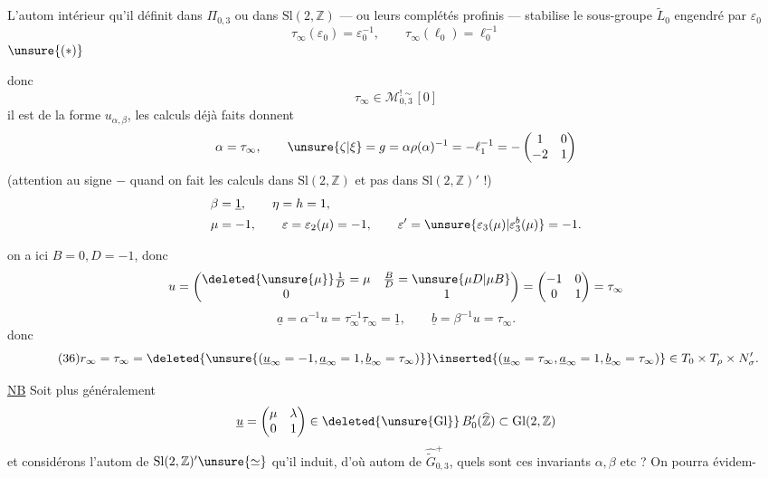 L'autom intérieur qu'il définit dans $\Pi_{0,3}$ ou dans $\mathrm{Sl}(2,\mathbb Z)$ --- ou leurs complétés profinis --- stabilise le sous-groupe $\widetilde L_0$ engendré par $\varepsilon_0$ 
\[
\tau_\infty(\varepsilon_0)=\varepsilon_0^{-1},\qquad\tau_\infty(\ell_0)=\ell_0^{-1}
\]
$\unsure{(\ast)}$

donc
\[
\tau_\infty\in\mathcal M_{0,3}^{!\sim}[0]
\]
  il est de la forme $u_{\alpha,\beta}$,  les calculs déjà faits donnent
\[
\alpha=\tau_\infty,\qquad
\unsure{\zeta|\xi}=g=\alpha\rho(\alpha)^{-1}=-\ell_1^{-1}
=-\begin{pmatrix}1&0\\-2&1\end{pmatrix}
\]
(attention au signe $-$ quand on fait les calculs dans $\mathrm{Sl}(2,\mathbb Z)$ et pas dans $\mathrm{Sl}(2,\mathbb Z)'$ !)
\[
\begin{aligned}
\beta&=\underline1,\qquad\eta=h=1,\\
\mu&=-1,\qquad\varepsilon=\varepsilon_2(\mu)=-1,\qquad
\varepsilon'=\unsure{\varepsilon_3(\mu)|\varepsilon_3^b(\mu)}=-1.
\end{aligned}
\]

on a ici $B=0,D=-1$, donc
\[
u=\begin{pmatrix}
\deleted{\unsure{\mu}}\frac1D=\mu&\frac BD=\unsure{\mu D|\mu B}\\
0&1
\end{pmatrix}
=\begin{pmatrix}-1&0\\0&1\end{pmatrix}=\tau_\infty
\]
\[
\underline a=\alpha^{-1}u=\tau_\infty^{-1}\tau_\infty=\underline1,
\qquad\underline b=\beta^{-1}u=\tau_\infty.
\]
donc
\[
\tag{36}
r_\infty=\tau_\infty=
\deleted{\unsure{(\underline u_\infty=-1,\underline a_\infty=1,\underline b_\infty=\tau_\infty)}}
\inserted{(\underline u_\infty=\tau_\infty,\underline a_\infty=1,\underline b_\infty=\tau_\infty)}
\in T_0\times T_\rho\times N'_\sigma.
\]

\uline{NB} Soit plus généralement
\[
\underline u=\begin{pmatrix}\mu&\lambda\\0&1\end{pmatrix}
\in\deleted{\unsure{\mathrm{Gl}}}\,B'_0(\widehat{\mathbb Z})\subset\mathrm{Gl}(2,\mathbb Z)
\]
et considérons l'autom  de $\mathrm{Sl}(2,\mathbb Z)'\unsure{\simeq}$ qu'il induit, d'où autom  de $\widehat{\widetilde G}_{0,3}^{+}$, quels sont ces invariants $\alpha,\beta$ etc ? On pourra évidem-


